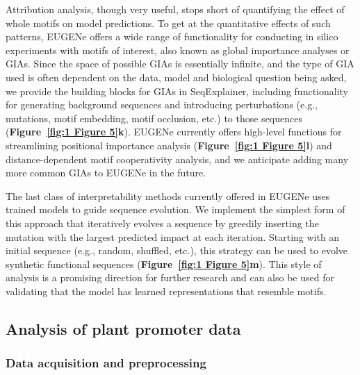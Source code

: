 Attribution analysis, though very useful, stops short of quantifying the effect of whole motifs on model predictions. To get at the quantitative effects of such patterns, EUGENe offers a wide range of functionality for conducting in silico experiments with motifs of interest\cite{De_Almeida2022-aa,Avsec2021-sw}, also known as global importance analyses or GIAs\cite{Koo2021-ly}. Since the space of possible GIAs is essentially infinite, and the type of GIA used is often dependent on the data, model and biological question being asked, we provide the building blocks for GIAs in SeqExplainer, including functionality for generating background sequences and introducing perturbations (e.g., mutations, motif embedding, motif occlusion, etc.) to those sequences (\textbf{Figure~\ref{fig:1 Figure 5}\textbf{k}}). EUGENe currently offers high-level functions for streamlining positional importance analysis (\textbf{Figure~\ref{fig:1 Figure 5}\textbf{l}}) and distance-dependent motif cooperativity analysis, and we anticipate adding many more common GIAs to EUGENe in the future.

The last class of interpretability methods currently offered in EUGENe uses trained models to guide sequence evolution. We implement the simplest form of this approach that iteratively evolves a sequence by greedily inserting the mutation with the largest predicted impact at each iteration. Starting with an initial sequence (e.g., random, shuffled, etc.), this strategy can be used to evolve synthetic functional sequences\cite{Taskiran2022-zj} (\textbf{Figure~\ref{fig:1 Figure 5}\textbf{m}}). This style of analysis is a promising direction for further research and can also be used for validating that the model has learned representations that resemble motifs.

\subsection{Analysis of plant promoter data}

\subsubsection{Data acquisition and preprocessing}

